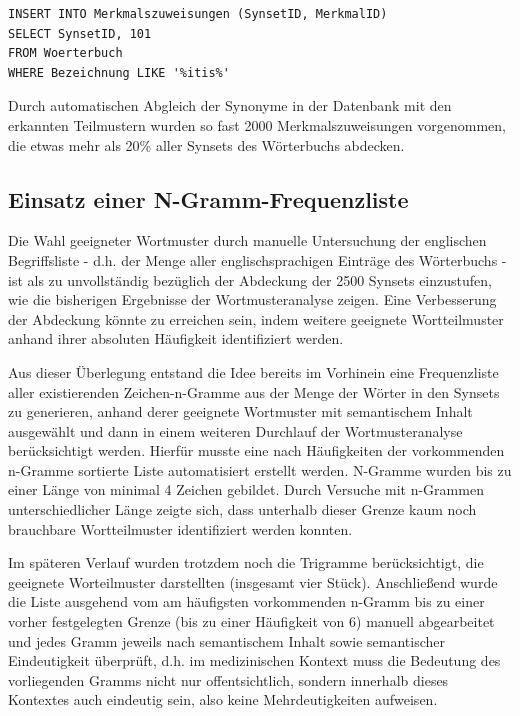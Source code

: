 \documentclass[pagesize,DIV=calc,12pt,draft]{scrreprt}
\begin{document}
\begin{lstlisting}
INSERT INTO Merkmalszuweisungen (SynsetID, MerkmalID) 
SELECT SynsetID, 101 
FROM Woerterbuch 
WHERE Bezeichnung LIKE '%itis%'
\end{lstlisting}

Durch automatischen Abgleich der Synonyme in der Datenbank mit den
erkannten Teilmustern wurden so fast 2000 Merkmalszuweisungen
vorgenommen, die etwas mehr als 20\% aller Synsets des Wörterbuchs
abdecken.

\subsection{Einsatz einer N-Gramm-Frequenzliste}

Die Wahl geeigneter Wortmuster durch manuelle Untersuchung der
englischen Begriffsliste - d.h. der Menge aller englischsprachigen
Einträge des Wörterbuchs - ist als zu unvollständig bezüglich der
Abdeckung der 2500 Synsets einzustufen, wie die bisherigen Ergebnisse
der Wortmusteranalyse zeigen.
Eine Verbesserung der Abdeckung könnte zu erreichen sein, indem weitere
geeignete Wortteilmuster anhand ihrer absoluten Häufigkeit identifiziert
werden.

Aus dieser Überlegung entstand die Idee bereits im Vorhinein eine
Frequenzliste aller existierenden Zeichen-n-Gramme aus der Menge der
Wörter in den Synsets zu generieren, anhand derer geeignete Wortmuster
mit semantischem Inhalt ausgewählt und dann in einem weiteren Durchlauf
der Wortmusteranalyse berücksichtigt werden.
Hierfür musste eine nach Häufigkeiten der vorkommenden n-Gramme
sortierte Liste automatisiert erstellt werden. N-Gramme wurden bis zu
einer Länge von minimal 4 Zeichen gebildet.
Durch Versuche mit n-Grammen unterschiedlicher Länge zeigte sich, dass
unterhalb dieser Grenze kaum noch brauchbare Wortteilmuster
identifiziert werden konnten.

Im späteren Verlauf wurden trotzdem noch die Trigramme berücksichtigt,
die geeignete Worteilmuster darstellten (insgesamt vier Stück).
Anschließend wurde die Liste ausgehend vom am häufigsten vorkommenden
n-Gramm bis zu einer vorher festgelegten Grenze (bis zu einer Häufigkeit
von 6) manuell abgearbeitet und jedes Gramm jeweils nach semantischem
Inhalt sowie semantischer Eindeutigkeit überprüft, d.h. im medizinischen
Kontext muss die Bedeutung des vorliegenden Gramms nicht nur
offentsichtlich, sondern innerhalb dieses Kontextes auch eindeutig sein,
also keine Mehrdeutigkeiten aufweisen.
\end{document}
